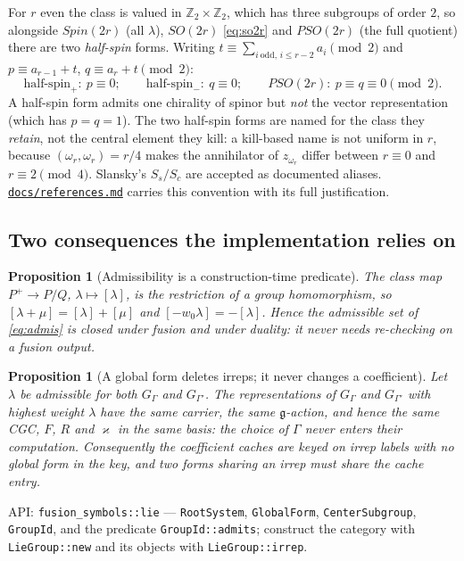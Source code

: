 \documentclass[11pt,a4paper]{article}
\theoremstyle{plain}
\newtheorem{proposition}[theorem]{Proposition}
\theoremstyle{definition}
\newcommand{\g}{\mathfrak{g}}
\newcommand{\ZZ}{\mathbb{Z}}
\newcommand{\code}[1]{\texttt{#1}}
\newcommand{\refsmd}{\href{https://github.com/Ryo-wtnb11/fusion-symbols/blob/main/docs/references.md}{\code{docs/references.md}}}
\begin{document}
For $r$ even the class is valued in $\ZZ_2\times\ZZ_2$, which has three
subgroups of order $2$, so alongside $Spin(2r)$ (all $\lambda$), $SO(2r)$
\eqref{eq:so2r} and $PSO(2r)$ (the full quotient) there are two
\emph{half-spin} forms. Writing
$t \equiv \sum_{i\ \mathrm{odd},\, i\le r-2} a_i \pmod 2$ and
$p \equiv a_{r-1}+t$, $q \equiv a_r + t \pmod 2$:
\[
  \text{half-spin}_+:\ p \equiv 0;\qquad
  \text{half-spin}_-:\ q \equiv 0;\qquad
  PSO(2r):\ p \equiv q \equiv 0 \pmod 2 .
\]
A half-spin form admits one chirality of spinor but \emph{not} the vector
representation (which has $p=q=1$). The two half-spin forms are named for the
class they \emph{retain}, not the central element they kill: a
kill-based name is not uniform in $r$, because $(\omega_r,\omega_r)=r/4$ makes
the annihilator of $z_{\omega_r}$ differ between $r\equiv0$ and $r\equiv2
\pmod 4$. Slansky's $S_s/S_c$ are accepted as documented aliases. \refsmd{}
carries this convention with its full justification.

\subsection{Two consequences the implementation relies on}

\begin{proposition}[Admissibility is a construction-time predicate]
The class map $P^+\to P/Q$, $\lambda\mapsto[\lambda]$, is the restriction of a
group homomorphism, so $[\lambda+\mu]=[\lambda]+[\mu]$ and
$[-w_0\lambda]=-[\lambda]$. Hence the admissible set of \eqref{eq:admis} is
closed under fusion and under duality: it never needs re-checking on a fusion
output.
\end{proposition}

\begin{proposition}[A global form deletes irreps; it never changes a coefficient]
\label{prop:samecoeff}
Let $\lambda$ be admissible for both $G_\Gamma$ and $G_{\Gamma'}$. The
representations of $G_\Gamma$ and $G_{\Gamma'}$ with highest weight $\lambda$
have the same carrier, the same $\g$-action, and hence the same CGC, $F$, $R$
and $\varkappa$ \emph{in the same basis}: the choice of $\Gamma$ never enters
their computation. Consequently the coefficient caches are keyed on irrep
labels with \emph{no global form in the key}, and two forms sharing an irrep
must share the cache entry.
\end{proposition}

\begin{sloppypar}
API: \code{fusion\_symbols::lie} --- \code{RootSystem}, \code{GlobalForm},
\code{CenterSubgroup}, \code{GroupId}, and the predicate
\code{GroupId::admits}; construct the category with \code{LieGroup::new}
and its objects with \code{LieGroup::irrep}.
\end{sloppypar}
\end{document}
